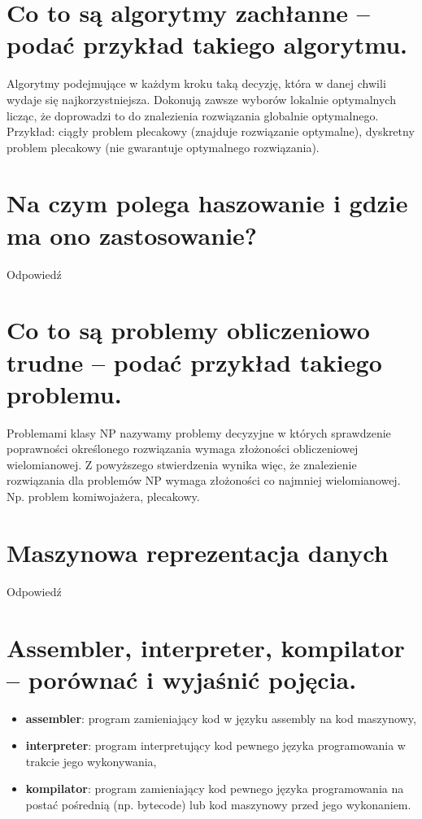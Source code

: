 \documentclass[12pt,a4paper]{article}
\begin{document}
	\section{Co to są algorytmy zachłanne – podać przykład takiego algorytmu.}
	Algorytmy podejmujące w każdym kroku taką decyzję, która w danej chwili wydaje się najkorzystniejsza. Dokonują zawsze wyborów lokalnie optymalnych licząc, że doprowadzi to do znalezienia rozwiązania globalnie optymalnego. Przykład: ciągły problem plecakowy (znajduje rozwiązanie optymalne), dyskretny problem plecakowy (nie gwarantuje optymalnego rozwiązania).

	\section{Na czym polega haszowanie i gdzie ma ono zastosowanie?}
	Odpowiedź

	\section{Co to są problemy obliczeniowo trudne – podać przykład takiego problemu.}
	Problemami klasy NP nazywamy problemy decyzyjne w których sprawdzenie poprawności określonego rozwiązania wymaga złożoności obliczeniowej wielomianowej. Z powyższego stwierdzenia wynika więc, że znalezienie rozwiązania dla problemów NP wymaga złożoności co najmniej wielomianowej. Np. problem komiwojażera, plecakowy.

	\section{Maszynowa reprezentacja danych}
	Odpowiedź

	\section{Assembler, interpreter, kompilator – porównać i wyjaśnić pojęcia.}
	\begin{itemize}	
		\item \textbf{assembler}: program zamieniający kod w języku assembly na kod maszynowy,
		\item \textbf{interpreter}: program interpretujący kod pewnego języka programowania w trakcie jego wykonywania,
		\item \textbf{kompilator}: program zamieniający kod pewnego języka programowania na postać pośrednią (np. bytecode) lub kod maszynowy przed jego wykonaniem.
\end{itemize}	
\end{document}
